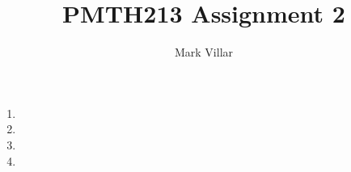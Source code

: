 \documentclass[12pt]{amsart}
\title{PMTH213 \hfill Assignment 2}
\author{Mark Villar}
\begin{document}
 

\maketitle 

\begin{enumerate}
	
	\item
			
	\item 
		
	\item 

	\item

\end{enumerate}
\end{document}
